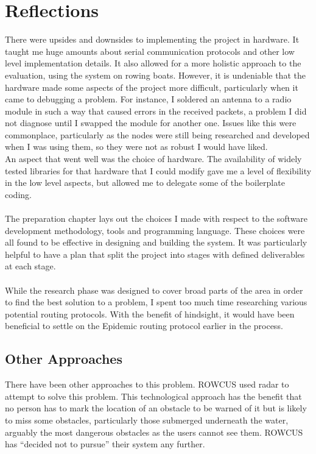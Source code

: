 \documentclass[12pt,a4paper]{report}
\begin{document}
{\section{Reflections}
There were upsides and downsides to implementing the project in hardware. It taught me huge amounts about serial communication protocols and other low level implementation details. It also allowed for a more holistic approach to the evaluation, using the system on rowing boats. However, it is undeniable that the hardware made some aspects of the project more difficult, particularly when it came to debugging a problem. For instance, I soldered an antenna to a radio module in such a way that caused errors in the received packets, a problem I did not diagnose until I swapped the module for another one. Issues like this were commonplace, particularly as the nodes were still being researched and developed when I was using them, so they were not as robust I would have liked. \\
An aspect that went well was the choice of hardware. The availability of widely tested libraries for that hardware that I could modify gave me a level of flexibility in the low level aspects, but allowed me to delegate some of the boilerplate coding. \\ \\
The preparation chapter lays out the choices I made with respect to the software development methodology, tools and programming language. These choices were all found to be effective in designing and building the system. It was particularly helpful to have a plan that split the project into stages with defined deliverables at each stage. \\ \\ 
While the research phase was designed to cover broad parts of the area in order to find the best solution to a problem, I spent too much time researching various potential routing protocols. With the benefit of hindsight, it would have been beneficial to settle on the Epidemic routing protocol earlier in the process. \\

\subsection{Other Approaches}
There have been other approaches to this problem. ROWCUS used radar to attempt to solve this problem. This technological approach has the benefit that no person has to mark the location of an obstacle to be warned of it but is likely to miss some obstacles, particularly those submerged underneath the water, arguably the most dangerous obstacles as the users cannot see them. ROWCUS has ``decided not to pursue'' their system any further. \\

}
\end{document}
